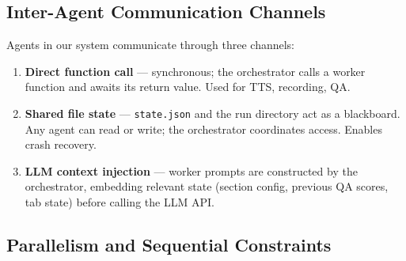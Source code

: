 \documentclass[12pt,a4paper]{article}
\begin{document}
\subsection{Inter-Agent Communication Channels}

Agents in our system communicate through three channels:

\begin{enumerate}[leftmargin=2em]
  \item \textbf{Direct function call} --- synchronous; the orchestrator calls a
        worker function and awaits its return value. Used for TTS, recording, QA.
  \item \textbf{Shared file state} --- \texttt{state.json} and the run directory
        act as a blackboard. Any agent can read or write; the orchestrator coordinates
        access. Enables crash recovery.
  \item \textbf{LLM context injection} --- worker prompts are constructed by the
        orchestrator, embedding relevant state (section config, previous QA scores,
        tab state) before calling the LLM API.
\end{enumerate}

\subsection{Parallelism and Sequential Constraints}
\end{document}
